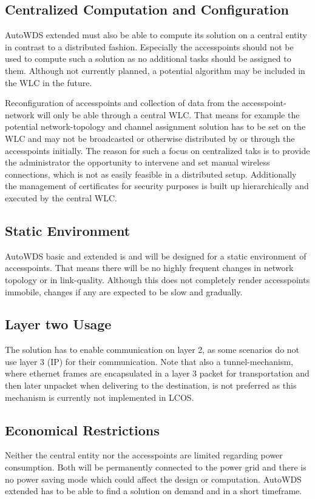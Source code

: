     \subsection{Centralized Computation and Configuration}
      AutoWDS extended must also be able to compute its solution on a central entity in contrast to a distributed fashion.
      Especially the accesspoints should not be used to compute such a solution as no additional tasks should be assigned to them.
      Although not currently planned, a potential algorithm may be included in the WLC in the future.
      
      Reconfiguration of accesspoints and collection of data from the accesspoint-network will only be able through a central \ac{WLC}.
      That means for example the potential network-topology and channel assignment solution has to be set on the WLC and may not be broadcasted or otherwise
      distributed by or through the accesspoints initially. The reason for such a focus on centralized taks is to provide the administrator the 
      opportunity to intervene and set manual wireless connections, which is not as easily feasible in a distributed setup. 
      Additionally the management of certificates for security purposes is built up hierarchically and executed by the central \ac{WLC}.
      
    \subsection{Static Environment}
      AutoWDS basic and extended is and will be designed for a static environment of accesspoints. That means there will be no highly frequent changes in
      network topology or in link-quality. Although this does not completely render accesspoints immobile, changes if any are expected to be slow and gradually.
      
    \subsection{Layer two Usage}
      The solution has to enable communication on layer 2, as some scenarios do not use layer 3 (IP) for their communication.
      Note that also a tunnel-mechanism, where ethernet frames are encapsulated in a layer 3 packet for transportation and then later unpacket when delivering to the destination,
      is not preferred as this mechanism is currently not implemented in LCOS.
    
    \subsection{Economical Restrictions}
      Neither the central entity nor the accesspoints are limited regarding power consumption. 
      Both will be permanently connected to the power grid and there is no power saving mode which could affect the design or computation.
      AutoWDS extended has to be able to find a solution on demand and in a short timeframe.
  